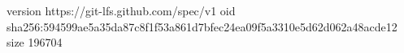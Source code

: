 version https://git-lfs.github.com/spec/v1
oid sha256:594599ae5a35da87c8f1f53a861d7bfec24ea09f5a3310e5d62d062a48acde12
size 196704
